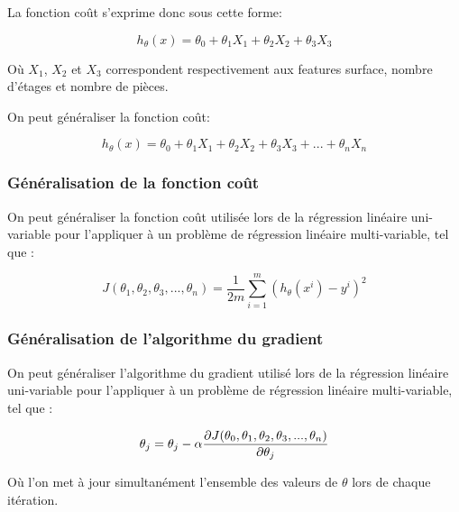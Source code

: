 La fonction coût s'exprime donc sous cette forme: 

\begin{equation}
	h_\theta(x) = \theta_0 + \theta_1X_1 + \theta_2X_2 + \theta_3X_3
\end{equation}

Où $X_1$, $X_2$ et $X_3$ correspondent respectivement aux features surface, nombre d'étages et nombre de pièces.

On peut généraliser la fonction coût: 

\begin{equation}
h_\theta(x) = \theta_0 + \theta_1X_1 + \theta_2X_2 + \theta_3X_3 + ... + \theta_nX_n
\label{hypotesis multivar}
\end{equation}


\subsubsection{Généralisation de la fonction coût}
\label{Le Machine Learning:Les différents algorithmes d'apprentissage supervisé: La regression linéaire multi-variable: Généralisation de la fonction coût}
On peut généraliser la fonction coût utilisée lors de la régression linéaire uni-variable pour l'appliquer à un problème de régression linéaire multi-variable, tel que :

\begin{equation}
J(\theta_1,\theta_2,\theta_3,...,\theta_n) =  \frac{1}{2m}\sum_{i=1}^{m}(h_\theta(x^i)-y^{i})^2
\end{equation}


\subsubsection{Généralisation de l'algorithme du gradient}
\label{Le Machine Learning:Les différents algorithmes d'apprentissage supervisé: La regression linéaire multi-variable: Généralisation de l'algorithme du gradient}
On peut généraliser l'algorithme du gradient utilisé lors de la régression linéaire uni-variable pour l'appliquer à un problème de régression linéaire multi-variable, tel que :
 
\begin{equation}
\theta_j = \theta_j - \alpha \frac{\partial J(\theta_0, \theta_1, \theta_2, \theta_3, ... , \theta_n)}{\partial\theta_j} \\
\end{equation}

Où l'on met à jour simultanément l'ensemble des valeurs de $\theta$ lors de chaque itération. 

